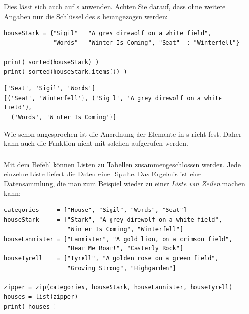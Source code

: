 Dies lässt sich auch auf s anwenden. Achten Sie darauf, dass ohne weitere Angaben nur die Schlüssel des s herangezogen werden:

\begin{codebox}
\begin{verbatim}
houseStark = {"Sigil" : "A grey direwolf on a white field",
              "Words" : "Winter Is Coming", "Seat"  : "Winterfell"}

print( sorted(houseStark) )
print( sorted(houseStark.items()) )
\end{verbatim}
\end{codebox}

\begin{cmdbox}[Ausgabe]
\begin{verbatim}
['Seat', 'Sigil', 'Words']
[('Seat', 'Winterfell'), ('Sigil', 'A grey direwolf on a white field'), 
  ('Words', 'Winter Is Coming')]
\end{verbatim}
\end{cmdbox}

Wie schon angesprochen ist die Anordnung der Elemente in s nicht fest. Daher kann auch die Funktion  nicht mit solchen aufgerufen werden.

\subsubsection{}
Mit dem Befehl  können Listen zu Tabellen zusammengeschlossen werden. Jede einzelne Liste liefert die Daten einer Spalte. Das Ergebnis ist eine Datensammlung, die man zum Beispiel wieder zu einer \emph{Liste von Zeilen} machen kann:

\begin{codebox}
\begin{verbatim}
categories     = ["House", "Sigil", "Words", "Seat"]
houseStark     = ["Stark", "A grey direwolf on a white field",
                  "Winter Is Coming", "Winterfell"]
houseLannister = ["Lannister", "A gold lion, on a crimson field",
                  "Hear Me Roar!", "Casterly Rock"]
houseTyrell    = ["Tyrell", "A golden rose on a green field",
                  "Growing Strong", "Highgarden"]

zipper = zip(categories, houseStark, houseLannister, houseTyrell)
houses = list(zipper)
print( houses )
\end{verbatim}
\end{codebox}

